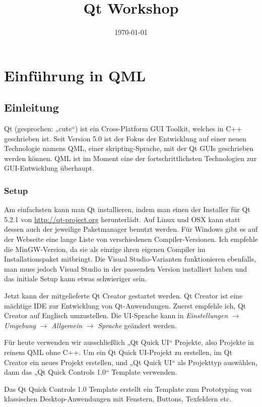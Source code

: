 \documentclass[a4paper]{article}
\date{\today}
\title{Qt Workshop}
\begin{document}
\maketitle

\section{Einführung in QML}
\label{sec-1}
\subsection{Einleitung}
\label{sec-1-1}
Qt (gesprochen: „cute“) ist ein Cross-Platform GUI Toolkit, welches in C++ geschrieben ist. Seit Version 5.0 ist der Fokus der Entwicklung auf einer neuen Technologie namens QML, einer skripting-Sprache, mit der Qt GUIs geschrieben werden können. QML ist im Moment eine der fortschrittlichsten Technologien zur GUI-Entwicklung überhaupt.

\subsubsection{Setup}
\label{sec-1-1-1}
Am einfachsten kann man Qt installieren, indem man einen der Installer für Qt 5.2.1 von \url{http://qt-project.org} herunterlädt. Auf Linux und OSX kann statt dessen auch der jeweilige Paketmanager benutzt werden. Für Windows gibt es auf der Webseite eine lange Liste von verschiedenen Compiler-Versionen. Ich empfehle die MinGW-Version, da sie als einzige ihren eigenen Compiler im Installationspaket mitbringt. Die Visual Studio-Varianten funktionieren ebenfalls, man muss jedoch Visual Studio in der passenden Version installiert haben und das initiale Setup kann etwas schwieriger sein.

Jetzt kann der mitgelieferte Qt Creator gestartet werden. Qt Creator ist eine mächtige IDE zur Entwicklung von Qt-Anwendungen. Zuerst empfehle ich, Qt Creator auf Englisch umzustellen. Die UI-Sprache kann in \emph{Einstellungen} $\rightarrow$ \emph{Umgebung} $\rightarrow$ \emph{Allgemein} $\rightarrow$ \emph{Sprache} geändert werden.

Für heute verwenden wir ausschließlich „Qt Quick UI“ Projekte, also Projekte in reinem QML ohne C++. Um ein Qt Quick UI-Projekt zu erstellen, im Qt Creator ein neues Projekt erstellen, und „Qt Quick UI“ als Projekttyp auswählen, dann das „Qt Quick Controls 1.0“ Template verwenden.

Das Qt Quick Controls 1.0 Template erstellt ein Template zum Prototyping von klassischen Desktop-Anwendungen mit Fenstern, Buttons, Texfeldern etc.
\end{document}
